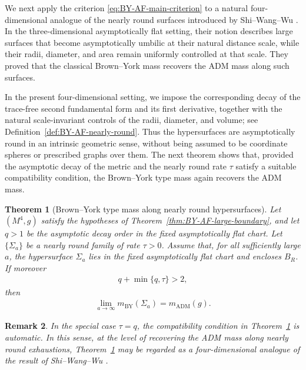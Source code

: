 \documentclass[10pt,a4paper]{amsart}
\newcommand{\ADM}{\mathrm{ADM}}
\newcommand{\BY}{\mathrm{BY}}
\newtheorem{theorem}{Theorem}[section]
\newtheorem{remark}[theorem]{Remark}
\begin{document}
	We next apply the criterion
	\eqref{eq:BY-AF-main-criterion} to a natural four-dimensional analogue
	of the nearly round surfaces introduced by Shi--Wang--Wu
	\cite{ShiWangWu}.  In the three-dimensional asymptotically flat setting,
	their notion describes large surfaces that become asymptotically umbilic
	at their natural distance scale, while their radii, diameter, and area
	remain uniformly controlled at that scale.  They proved that the
	classical Brown--York mass recovers the ADM mass along such surfaces.
	
	In the present four-dimensional setting, we impose the corresponding
	decay of the trace-free second fundamental form and its first derivative,
	together with the natural scale-invariant controls of the radii,
	diameter, and volume; see
	Definition~\ref{def:BY-AF-nearly-round}.  Thus the hypersurfaces are
	asymptotically round in an intrinsic geometric sense, without being
	assumed to be coordinate spheres or prescribed graphs over them.  The
	next theorem shows that, provided the asymptotic decay of the metric and
	the nearly round rate $\tau$ satisfy a suitable compatibility condition,
	the Brown--York type mass again recovers the ADM mass.
	
	\begin{theorem}[Brown--York type mass along nearly round hypersurfaces]
		\label{thm:BY-AF-nearly-round}
		Let $(M^4,g)$ satisfy the hypotheses of
		Theorem~\ref{thm:BY-AF-large-boundary}, and let $q>1$ be the
		asymptotic decay order in the fixed asymptotically flat chart.
		Let $\{\Sigma_a\}$ be a nearly round family of rate $\tau>0$.
		Assume that, for all sufficiently large $a$, the hypersurface
		$\Sigma_a$ lies in the fixed asymptotically flat chart and encloses
		$B_R$. If moreover
		\begin{align*}
			q+\min\{q,\tau\}>2,
		\end{align*}
		then
		\begin{align}
			\lim_{a\to\infty}m_{\BY}(\Sigma_a)
			=
			m_{\ADM}(g).
		\end{align}
	\end{theorem}
	
	\begin{remark}
		In the special case $\tau=q$, the compatibility condition in
		Theorem~\ref{thm:BY-AF-nearly-round} is automatic. In this sense, at the level of recovering
		the ADM mass along nearly round exhaustions,
		Theorem~\ref{thm:BY-AF-nearly-round} may be regarded as a
		four-dimensional analogue of the result of Shi--Wang--Wu
		\cite{ShiWangWu}.
	\end{remark}
	
\end{document}
